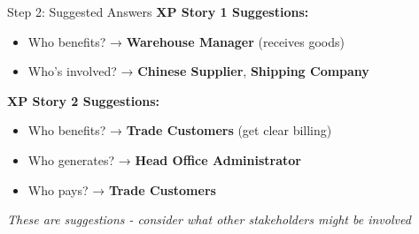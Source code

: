 \documentclass[
  ignorenonframetext,
]{beamer}
\providecommand{\tightlist}{%
  \setlength{\itemsep}{0pt}\setlength{\parskip}{0pt}}
\begin{document}
\begin{frame}{Step 2: Suggested Answers}
\label{step-2-suggested-answers}
\textbf{XP Story 1 Suggestions:}

\begin{itemize}
\tightlist
\item
  Who benefits? → \textbf{Warehouse Manager} (receives goods)
\item
  Who's involved? → \textbf{Chinese Supplier}, \textbf{Shipping Company}
\end{itemize}

\textbf{XP Story 2 Suggestions:}

\begin{itemize}
\tightlist
\item
  Who benefits? → \textbf{Trade Customers} (get clear billing)
\item
  Who generates? → \textbf{Head Office Administrator}
\item
  Who pays? → \textbf{Trade Customers}
\end{itemize}

\emph{These are suggestions - consider what other stakeholders might be
involved}
\end{frame}
\end{document}
